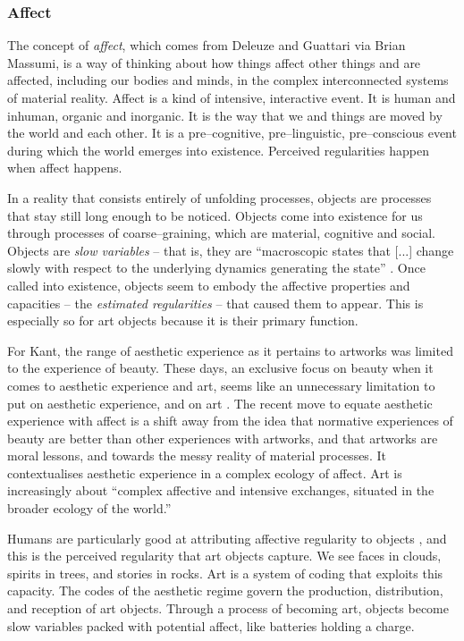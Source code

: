\documentclass[letterpaper]{article}
\begin{document}
    \subsubsection{Affect}

    The concept of \emph{affect}, which comes from Deleuze and Guattari via Brian Massumi, is a way of thinking about how things affect other things and are affected, including our bodies and minds, in the complex interconnected systems of material reality. Affect is a kind of intensive, interactive event. It is human and inhuman, organic and inorganic. It is the way that we and things are moved by the world and each other. It is a pre–cognitive, pre–linguistic, pre–conscious event during which the world emerges into existence. Perceived regularities happen when affect happens.
    
    In a reality that consists entirely of unfolding processes, objects are processes that stay still long enough to be noticed. Objects come into existence for us through processes of coarse–graining, which are material, cognitive and social. Objects are \emph{slow variables} – that is, they are “macroscopic states that [...] change slowly with respect to the underlying dynamics generating the state” \citep[p.61]{FlackEtAlTmsclsSymmtryUncrtnty2013}. Once called into existence, objects seem to embody the affective properties and capacities – the \emph{estimated regularities} \citep[p.9]{FlackCrsGrnng2017} – that caused them to appear. This is especially so for art objects because it is their primary function.

    For Kant, the range of aesthetic experience as it pertains to artworks was limited to the experience of beauty. These days, an exclusive focus on beauty when it comes to aesthetic experience and art, seems like an unnecessary limitation to put on aesthetic experience, and on art \citep[pp.121–122]{HighmoreBttrAftrTst2010}. The recent move to equate aesthetic experience with affect is a shift away from the idea that normative experiences of beauty are better than other experiences with artworks, and that artworks are moral lessons, and towards the messy reality of material processes. It contextualises aesthetic experience in a complex ecology of affect. Art is increasingly about “complex affective and intensive exchanges, situated in the broader ecology of the world.” \citep[p.155]{HighmoreBttrAftrTst2010}

    Humans are particularly good at attributing affective regularity to objects \citep{FristonThFrEnrgPrncpl2010} \citep{DeaconTheSymbolicSpecies1998}, and this is the perceived regularity that art objects capture. We see faces in clouds, spirits in trees, and stories in rocks. Art is a system of coding that exploits this capacity. The codes of the aesthetic regime govern the production, distribution, and reception of art objects. Through a process of becoming art, objects become slow variables packed with potential affect, like batteries holding a charge.
\end{document}
